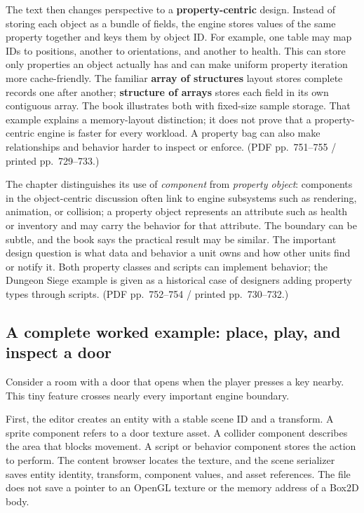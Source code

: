 The text then changes perspective to a \textbf{property-centric} design. Instead of storing each object as a bundle of fields, the engine stores values of the same property together and keys them by object ID. For example, one table may map IDs to positions, another to orientations, and another to health. This can store only properties an object actually has and can make uniform property iteration more cache-friendly. The familiar \textbf{array of structures} layout stores complete records one after another; \textbf{structure of arrays} stores each field in its own contiguous array. The book illustrates both with fixed-size sample storage. That example explains a memory-layout distinction; it does not prove that a property-centric engine is faster for every workload. A property bag can also make relationships and behavior harder to inspect or enforce. (PDF pp.~751--755 / printed pp.~729--733.)

The chapter distinguishes its use of \emph{component} from \emph{property object}: components in the object-centric discussion often link to engine subsystems such as rendering, animation, or collision; a property object represents an attribute such as health or inventory and may carry the behavior for that attribute. The boundary can be subtle, and the book says the practical result may be similar. The important design question is what data and behavior a unit owns and how other units find or notify it. Both property classes and scripts can implement behavior; the Dungeon Siege example is given as a historical case of designers adding property types through scripts. (PDF pp.~752--754 / printed pp.~730--732.)

\subsection{A complete worked example: place, play, and inspect a door}\label{06-engine-ii-ch041-a-complete-worked-example-place-play-and-inspect-a-door}

Consider a room with a door that opens when the player presses a key nearby. This tiny feature crosses nearly every important engine boundary.

First, the editor creates an entity with a stable scene ID and a transform. A sprite component refers to a door texture asset. A collider component describes the area that blocks movement. A script or behavior component stores the action to perform. The content browser locates the texture, and the scene serializer saves entity identity, transform, component values, and asset references. The file does not save a pointer to an OpenGL texture or the memory address of a Box2D body.


